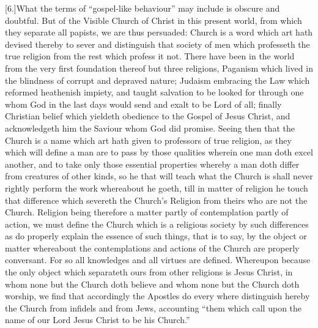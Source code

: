 [6.]What the terms of “gospel-like behaviour” may include is obscure and doubtful. But of the Visible Church of Christ in this present world, from which they separate all papists, we are thus persuaded: Church is a word which art hath devised thereby to sever and distinguish that society of men which professeth the true religion from the rest which profess it not. There have been in the world from the very first foundation thereof but three religions, Paganism which lived in the blindness of corrupt and depraved nature; Judaism embracing the Law which reformed heathenish impiety, and taught salvation to be looked for through one whom God in the last days would send and exalt to be Lord of all; finally Christian belief which yieldeth obedience to the Gospel of Jesus Christ, and acknowledgeth him the Saviour whom God did promise. Seeing then that the Church is a name which art hath given to professors of true religion, as they which will define a man are to pass by those qualities wherein one man doth excel another, and to take only those essential properties whereby a man doth differ from creatures of other kinds, so he that will teach what the Church is shall never rightly perform the work whereabout he goeth, till in matter of religion he touch that difference which severeth the Church’s Religion from theirs who are not the Church. Religion being therefore a matter partly of contemplation partly of action, we must define the Church which is a religious society by such differences as do properly explain the essence of such things, that is to say, by the object or matter whereabout the contemplations and actions of the Church are properly conversant. For so all knowledges and all virtues are defined. Whereupon because the only object which separateth ours from other religions is Jesus Christ, in whom none but the Church doth  believe and whom none but the Church doth worship, we find that accordingly the Apostles do every where distinguish hereby the Church from infidels and from Jews, accounting “them which call upon the name of our Lord Jesus Christ to be his Church.”

